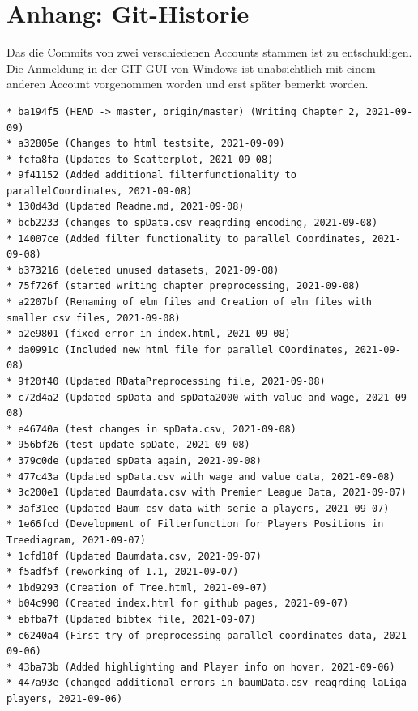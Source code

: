 \documentclass[usegeometry=true]{scrartcl}
\begin{document}

\newpage

\setcounter{page}{4}
\section*{Anhang: Git-Historie}
Das die Commits von zwei verschiedenen Accounts stammen ist zu entschuldigen. Die Anmeldung in der GIT GUI von Windows ist unabsichtlich mit einem anderen Account vorgenommen worden und erst später bemerkt worden.

\begin{verbatim}
* ba194f5 (HEAD -> master, origin/master) (Writing Chapter 2, 2021-09-09)
* a32805e (Changes to html testsite, 2021-09-09)
* fcfa8fa (Updates to Scatterplot, 2021-09-08)
* 9f41152 (Added additional filterfunctionality to parallelCoordinates, 2021-09-08)
* 130d43d (Updated Readme.md, 2021-09-08)
* bcb2233 (changes to spData.csv reagrding encoding, 2021-09-08)
* 14007ce (Added filter functionality to parallel Coordinates, 2021-09-08)
* b373216 (deleted unused datasets, 2021-09-08)
* 75f726f (started writing chapter preprocessing, 2021-09-08)
* a2207bf (Renaming of elm files and Creation of elm files with smaller csv files, 2021-09-08)
* a2e9801 (fixed error in index.html, 2021-09-08)
* da0991c (Included new html file for parallel COordinates, 2021-09-08)
* 9f20f40 (Updated RDataPreprocessing file, 2021-09-08)
* c72d4a2 (Updated spData and spData2000 with value and wage, 2021-09-08)
* e46740a (test changes in spData.csv, 2021-09-08)
* 956bf26 (test update spDate, 2021-09-08)
* 379c0de (updated spData again, 2021-09-08)
* 477c43a (Updated spData.csv with wage and value data, 2021-09-08)
* 3c200e1 (Updated Baumdata.csv with Premier League Data, 2021-09-07)
* 3af31ee (Updated Baum csv data with serie a players, 2021-09-07)
* 1e66fcd (Development of Filterfunction for Players Positions in Treediagram, 2021-09-07)
* 1cfd18f (Updated Baumdata.csv, 2021-09-07)
* f5adf5f (reworking of 1.1, 2021-09-07)
* 1bd9293 (Creation of Tree.html, 2021-09-07)
* b04c990 (Created index.html for github pages, 2021-09-07)
* ebfba7f (Updated bibtex file, 2021-09-07)
* c6240a4 (First try of preprocessing parallel coordinates data, 2021-09-06)
* 43ba73b (Added highlighting and Player info on hover, 2021-09-06)
* 447a93e (changed additional errors in baumData.csv reagrding laLiga players, 2021-09-06)

\end{verbatim}
\end{document}

